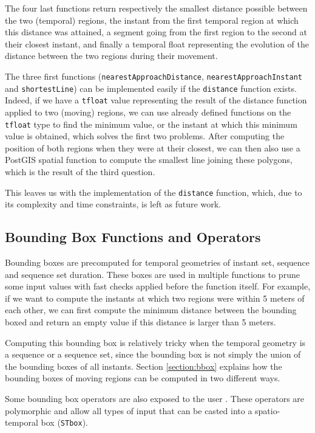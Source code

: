 The four last functions return respectively the smallest distance possible between the two (temporal) regions, the instant from the first temporal region at which this distance was attained, a segment going from the first region to the second at their closest instant, and finally a temporal float representing the evolution of the distance between the two regions during their movement. 

The three first functions (\lstinline{nearestApproachDistance}, \lstinline{nearestApproachInstant} and \lstinline{shortestLine}) can be implemented easily if the \lstinline{distance} function exists. Indeed, if we have a \lstinline+tfloat+ value representing the result of the distance function applied to two (moving) regions, we can use already defined functions on the \lstinline+tfloat+ type to find the minimum value, or the instant at which this minimum value is obtained, which solves the first two problems. After computing the position of both regions when they were at their closest, we can then also use a PostGIS spatial function to compute the smallest line joining these polygons, which is the result of the third question.

This leaves us with the implementation of the \lstinline{distance} function, which, due to its complexity and time constraints, is left as future work.

\subsection{Bounding Box Functions and Operators}
\label{section:bbox_funcs}

Bounding boxes are precomputed for temporal geometries of instant set, sequence and sequence set duration. These boxes are used in multiple functions to prune some input values with fast checks applied before the function itself. For example, if we want to compute the instants at which two regions were within 5 meters of each other, we can first compute the minimum distance between the bounding boxed and return an empty value if this distance is larger than 5 meters.

Computing this bounding box is relatively tricky when the temporal geometry is a sequence or a sequence set, since the bounding box is not simply the union of the bounding boxes of all instants. Section \ref{section:bbox} explains how the bounding boxes of moving regions can be computed in two different ways.

Some bounding box operators are also exposed to the user . These operators are polymorphic and allow all types of input that can be casted into a spatio-temporal box (\lstinline+STbox+). 

